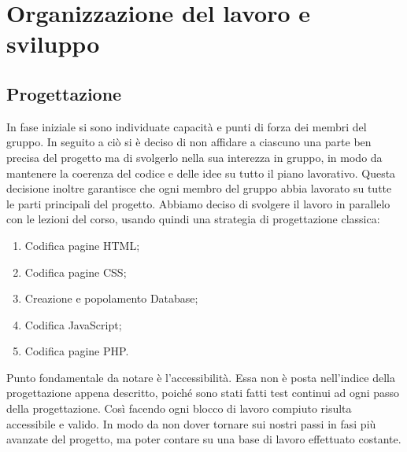 \section{Organizzazione del lavoro e sviluppo}
\label{organizzazionelavoro}

\subsection{Progettazione}
In fase iniziale si sono individuate capacità e punti di forza dei membri del gruppo.
In seguito a ciò si è deciso di non affidare a ciascuno una parte ben precisa del progetto ma di svolgerlo nella sua interezza in gruppo, in modo da mantenere la coerenza del codice e delle idee su tutto il piano lavorativo.
Questa decisione inoltre garantisce che ogni membro del gruppo abbia lavorato su tutte le parti principali del progetto.
Abbiamo deciso di svolgere il lavoro in parallelo con le lezioni del corso, usando quindi una strategia di progettazione classica:
\begin{enumerate}
\item Codifica pagine HTML;
\item Codifica pagine CSS;
\item Creazione e popolamento Database;
\item Codifica JavaScript;
\item Codifica pagine PHP.
\end{enumerate}
Punto fondamentale da notare è l’accessibilità. Essa non è posta nell’indice della progettazione appena descritto, poiché sono stati fatti test continui ad ogni passo della progettazione.
Così facendo ogni blocco di lavoro compiuto risulta accessibile e valido.
In modo da non dover tornare sui nostri passi in fasi più avanzate del progetto, ma poter contare su una base di lavoro effettuato costante.

